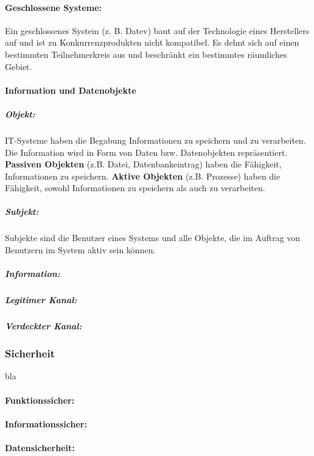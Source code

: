 \paragraph{Geschlossene Systeme:}

Ein geschlossenes System (z. B. Datev) baut auf der Technologie eines Herstellers auf und ist zu Konkurrenzprodukten nicht kompatibel.  Es dehnt sich auf einen bestimmten Teilnehmerkreis aus und beschränkt ein bestimmtes räumliches Gebiet\cite[22--23]{eckert2013sicherheit}.

\paragraph{Information und Datenobjekte}

\subparagraph{Objekt:}

IT-Systeme haben die Begabung Informationen zu speichern und zu verarbeiten. Die Information wird in Form von Daten bzw. Datenobjekten repräsentiert. \textbf{Passiven Objekten} (z.B. Datei, Datenbankeintrag) haben die Fähigkeit, Informationen zu speichern. \textbf{Aktive Objekten} (z.B. Prozesse) haben die Fähigkeit, sowohl Informationen zu speichern als auch zu verarbeiten\cite[23]{eckert2013sicherheit}.

\subparagraph{Subjekt:}

Subjekte sind die Benutzer eines Systems und alle Objekte, die im Auftrag von Benutzern im System aktiv sein können\cite[24]{eckert2013sicherheit}.

\subparagraph{Information:}





  

\subparagraph{Legitimer Kanal:}

\subparagraph{Verdeckter Kanal:}

\subsubsection{Sicherheit}
bla
\paragraph{Funktionssicher:}

\paragraph{Informationssicher:}

\paragraph{Datensicherheit:}

